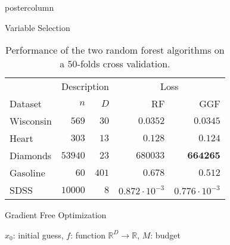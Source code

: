 \documentclass[dvipsnames]{beamer}
\begin{document}
\begin{frame}
\begin{columns}
\begin{column}{.5\textwidth}
\begin{beamercolorbox}[center]{postercolumn}
\begin{minipage}{.98\textwidth}
{\begin{myblock}{Variable Selection}
\begin{table}[H]
                            \centering
                            \begin{tabular}{lrrrr}
                                & \multicolumn{2}{c}{Description} & \multicolumn{2}{c}{Loss} \\
                                \cmidrule(l){2-3} \cmidrule(l){4-5}
                                Dataset & $n$ & $D$ & RF & GGF \\
                                \midrule
                                Wisconsin & $569$ & $30$ & $0.0352$ & $\mathbf{0.0345}$ \\
                                Heart & $303$ & $13$ & $0.128$ & $\mathbf{0.124}$ \\
                                Diamonds & $53940$ & $23$ & $680033$ & $\mathbf{664265}$ \\
                                Gasoline & $60$ & $401$ & $0.678$ & $\mathbf{0.512}$ \\
                                SDSS & $10000$ & $8$ & $0.872\cdot 10^{-3}$  & $\mathbf{0.776}\cdot 10^{-3}$ \\
                                \bottomrule
                            \end{tabular}
                            \caption{Performance of the two random forest algorithms on a $50$-folds cross validation.}\label{table:results}
                        \end{table}
                    \end{myblock}
					\begin{myblock}{Gradient Free Optimization}
                        \begin{algorithm}[H]
                            \caption{Estimated Gradient Descent}\label{alg:lolamin}
                            \begin{algorithmic}[1] %
                                \Require $x_0$: initial guess, $f$: function $\mathbb{R}^D \to \mathbb{R}$, $M$: budget

\end{algorithmic}
\end{algorithm}
\end{myblock}}
\end{minipage}
\end{beamercolorbox}
\end{column}
\end{columns}
\end{frame}
\end{document}
